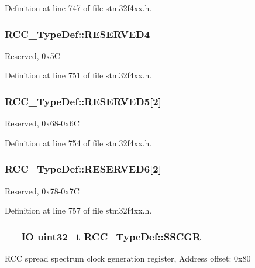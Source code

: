 Definition at line 747 of file stm32f4xx.\-h.

\hypertarget{struct_r_c_c___type_def_a0f009e4bd1777ac1b86ca27e23361a0e}{
\subsubsection[{R\-E\-S\-E\-R\-V\-E\-D4}]{ R\-C\-C\-\_\-\-Type\-Def\-::\-R\-E\-S\-E\-R\-V\-E\-D4}}\label{struct_r_c_c___type_def_a0f009e4bd1777ac1b86ca27e23361a0e}
Reserved, 0x5\-C 

Definition at line 751 of file stm32f4xx.\-h.

\hypertarget{struct_r_c_c___type_def_af9159a971013ef0592be8be3e256a344}{
\subsubsection[{R\-E\-S\-E\-R\-V\-E\-D5}]{ R\-C\-C\-\_\-\-Type\-Def\-::\-R\-E\-S\-E\-R\-V\-E\-D5\mbox{[}2\mbox{]}}}\label{struct_r_c_c___type_def_af9159a971013ef0592be8be3e256a344}
Reserved, 0x68-\/0x6\-C 

Definition at line 754 of file stm32f4xx.\-h.

\hypertarget{struct_r_c_c___type_def_a30cfd1a2f2eb931bacfd2be965e53d1b}{
\subsubsection[{R\-E\-S\-E\-R\-V\-E\-D6}]{ R\-C\-C\-\_\-\-Type\-Def\-::\-R\-E\-S\-E\-R\-V\-E\-D6\mbox{[}2\mbox{]}}}\label{struct_r_c_c___type_def_a30cfd1a2f2eb931bacfd2be965e53d1b}
Reserved, 0x78-\/0x7\-C 

Definition at line 757 of file stm32f4xx.\-h.

\hypertarget{struct_r_c_c___type_def_a52270ad1423c68cd536f62657bb669f5}{
\subsubsection[{S\-S\-C\-G\-R}]{\setlength{\rightskip}{0pt plus 5cm}\-\_\-\-\_\-\-I\-O {\bf uint32\-\_\-t} R\-C\-C\-\_\-\-Type\-Def\-::\-S\-S\-C\-G\-R}}\label{struct_r_c_c___type_def_a52270ad1423c68cd536f62657bb669f5}
R\-C\-C spread spectrum clock generation register, Address offset\-: 0x80 

